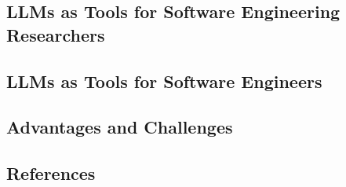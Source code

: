 



\subsection{LLMs as Tools for Software Engineering Researchers}
\label{sec:llms-as-tools-for-software-engineering-researchers}











\subsection{LLMs as Tools for Software Engineers}
\label{sec:llms-as-tools-for-software-engineers}









\subsection{Advantages and Challenges}
\label{sec:advantages-challenges}



\subsection{References}





